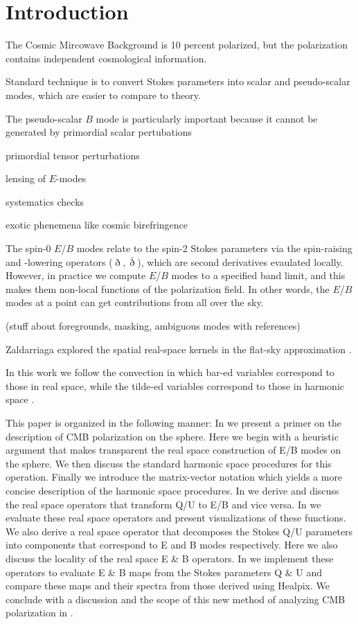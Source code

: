 \section{Introduction}
The Cosmic Mircowave Background is 10 percent polarized, but the polarization contains independent cosmological information.

Standard technique is to convert Stokes parameters into scalar and pseudo-scalar modes, which are easier to compare to theory.

The pseudo-scalar $B$ mode is particularly important because it cannot be generated by primordial scalar pertubations

primordial tensor perturbations

lensing of $E$-modes

systematics checks

exotic phenemena like cosmic birefringence

The spin-0 $E$/$B$ modes relate to the spin-2 Stokes parameters via the spin-raising and -lowering operators ($\eth,\bar \eth$), which are second derivatives evaulated locally.  However, in practice we compute $E$/$B$ modes to a specified band limit, and this makes them non-local functions of the polarization field.  In other words, the $E$/$B$ modes at a point can get contributions from all over the sky.

(stuff about foregrounds, masking, ambiguous modes with references)

Zaldarriaga explored the spatial real-space kernels in the flat-sky approximation \citep{}.

In this work we follow the convection in which bar-ed variables correspond to those in real space, while the tilde-ed variables correspond to those in harmonic space \cite{Zaldarriaga2001a}. 

This paper is organized in the following manner: In  we present a primer on the description of CMB polarization on the sphere. Here we begin with a heuristic argument that makes transparent the real space construction of E/B modes on the sphere. We then discuss the standard harmonic space procedures for this operation. Finally we introduce the matrix-vector notation which yields a more concise description of the harmonic space procedures. In  we derive and discuss the real space operators that transform Q/U to E/B and vice versa. In  we evaluate these real space operators and present visualizations of these functions. We also derive a real space operator that decomposes the Stokes Q/U  parameters into components that correspond to E and B modes respectively.  Here we also discuss the locality of the real space E \& B operators. In  we implement these operators to evaluate E \& B  maps from the Stokes parameters Q \& U and compare these maps and their spectra from those derived using Healpix. We conclude with a discussion and the scope of this new method of analyzing CMB polarization in .
